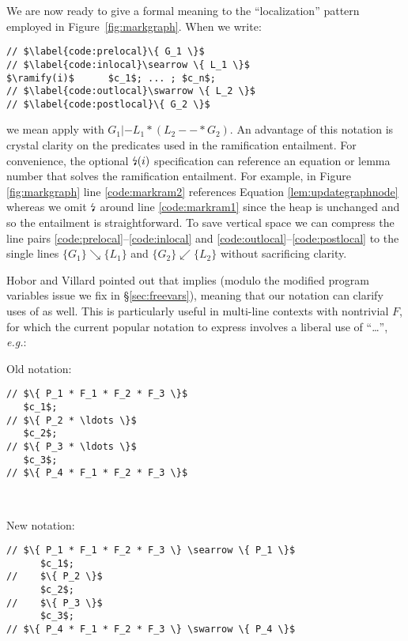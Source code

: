We are now ready to give a formal meaning to the ``localization'' pattern employed in Figure~\ref{fig:markgraph}.  When we write:
\vspace{-4ex}
\begin{lstlisting}
// $\label{code:prelocal}\{ G_1 \}$
// $\label{code:inlocal}\searrow \{ L_1 \}$
$\ramify(i)$      $c_1$; ... ; $c_n$;
// $\label{code:outlocal}\swarrow \{ L_2 \}$
// $\label{code:postlocal}\{ G_2 \}$
\end{lstlisting}
\vspace{-1.5ex}
we mean apply  with $G_1 |- L_1 * (L_2 --* G_2)$.
An advantage of this notation is crystal clarity on the predicates used in the ramification entailment.  For convenience, the optional $\mbox{\lightning}(i)$ specification can reference an equation or lemma number that solves the ramification entailment.  For example, in Figure \ref{fig:markgraph} line \ref{code:markram2} references Equation \eqref{lem:updategraphnode} whereas we omit $\mbox{\lightning}$ around line \ref{code:markram1} since the heap is unchanged and so the entailment is straightforward. To save vertical space we can compress the line pairs \ref{code:prelocal}--\ref{code:inlocal} and \ref{code:outlocal}--\ref{code:postlocal}
to the single lines $\{ G_1 \} \searrow \{ L_1 \}$ and $\{ G_2 \} \swarrow \{ L_2 \}$ without sacrificing clarity.

Hobor and Villard pointed out that  implies  (modulo the modified program variables issue we fix in \S\ref{sec:freevars}), meaning that our notation can clarify uses of  as well.  This is particularly useful in multi-line contexts with nontrivial $F$, for which the current popular notation to express  involves a liberal use of ``\ldots'', \emph{e.g.}:

\vspace{5pt}

\begin{minipage}{.19\textwidth}
Old notation:
\begin{lstlisting}
// $\{ P_1 * F_1 * F_2 * F_3 \}$
   $c_1$;
// $\{ P_2 * \ldots \}$
   $c_2$;
// $\{ P_3 * \ldots \}$
   $c_3$;
// $\{ P_4 * F_1 * F_2 * F_3 \}$
\end{lstlisting}
\end{minipage} \vline ~~~
\begin{minipage}{.2\textwidth}
New notation:
\begin{lstlisting}[numbers=none]
// $\{ P_1 * F_1 * F_2 * F_3 \} \searrow \{ P_1 \}$
      $c_1$;
//    $\{ P_2 \}$
      $c_2$;
//    $\{ P_3 \}$
      $c_3$;
// $\{ P_4 * F_1 * F_2 * F_3 \} \swarrow \{ P_4 \}$
\end{lstlisting}
\end{minipage}
\vspace{-0.75ex}



